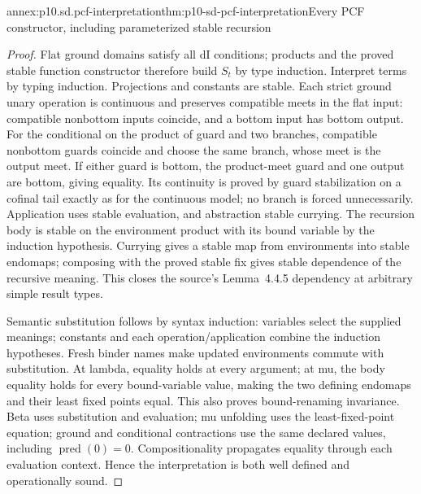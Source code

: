 \begin{annexitem}{annex:p10.sd.pcf-interpretation}{thm:p10-sd-pcf-interpretation}{Every PCF constructor, including parameterized stable recursion}
\begin{proof}
Flat ground domains satisfy all dI conditions; products and the proved
stable function constructor therefore build \(S_t\) by type induction.
Interpret terms by typing induction. Projections and constants are stable.
Each strict ground unary operation is continuous and preserves compatible
meets in the flat input: compatible nonbottom inputs coincide, and a
bottom input has bottom output. For the conditional on the product of
guard and two branches, compatible nonbottom guards coincide and choose
the same branch, whose meet is the output meet. If either guard is
bottom, the product-meet guard and one output are bottom, giving equality.
Its continuity is proved by guard stabilization on a cofinal tail exactly
as for the continuous model; no branch is forced unnecessarily.
Application uses stable evaluation, and abstraction stable currying.
The recursion body is stable on the environment product with its bound
variable by the induction hypothesis. Currying gives a stable map from
environments into stable endomaps; composing with the proved stable fix
gives stable dependence of the recursive meaning. This closes the
source's Lemma~4.4.5 dependency at arbitrary simple result types.

Semantic substitution follows by syntax induction: variables select the
supplied meanings; constants and each operation/application combine the
induction hypotheses. Fresh binder names make updated environments
commute with substitution. At lambda, equality holds at every argument;
at mu, the body equality holds for every bound-variable value, making
the two defining endomaps and their least fixed points equal.
This also proves bound-renaming invariance. Beta uses substitution and
evaluation; mu unfolding uses the least-fixed-point equation; ground and
conditional contractions use the same declared values, including \(\operatorname{pred}(0)=0\).
Compositionality propagates equality through each evaluation context.
Hence the interpretation is both well defined and operationally sound.
\end{proof}
\end{annexitem}

